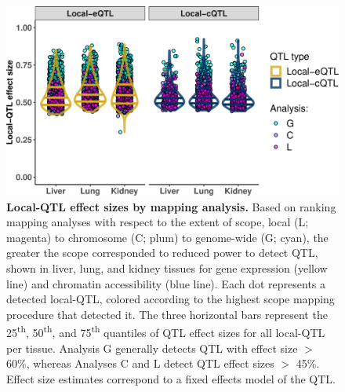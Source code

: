 \documentclass[10pt,letterpaper,twoside]{article}
\begin{document}
\begin{figure}[hp]
\renewcommand{\familydefault}{\sfdefault}\normalfont
\centering
\includegraphics[width=\textwidth, trim={0in 0in 0in 0in}, clip]{figs/local_qtl_effects.png}
\caption{\textbf{Local-QTL effect sizes by mapping analysis.} 
Based on ranking mapping analyses with respect to the extent of scope, local (L; magenta) to chromosome (C; plum) to genome-wide (G; cyan), the greater the scope corresponded to reduced power to detect QTL, shown in liver, lung, and kidney tissues for gene expression (yellow line) and chromatin accessibility (blue line). Each dot represents a detected local-QTL, colored according to the highest scope mapping procedure that detected it. The three horizontal bars represent the 25\textsuperscript{th}, 50\textsuperscript{th}, and 75\textsuperscript{th} quantiles of QTL effect sizes for all local-QTL per tissue. Analysis G generally detects QTL with effect size $>$ 60\%, whereas Analyses C and L detect QTL effect sizes $>$ 45\%. Effect size estimates correspond to a fixed effects model of the QTL.
\label{fig:qtl_effect_sizes_by_method}}
\end{figure}

\clearpage
\end{document}
